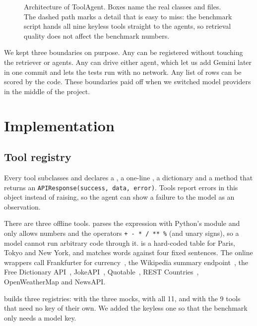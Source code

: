\documentclass[conference,a4paper]{IEEEtran}
\begin{document}
\begin{figure}[t]
  \centering
  
  \caption{Architecture of ToolAgent. Boxes name the real classes and
  files. The dashed path marks a detail that is easy to miss: the
  benchmark script hands all nine keyless tools straight to the agents,
  so retrieval quality does not affect the benchmark numbers.}
  \label{fig:arch}
\end{figure}

We kept three boundaries on purpose. Any  can be registered
without touching the retriever or agents. Any  can drive
either agent, which let us add Gemini later in one commit and lets the
tests run with no network. Any list of rows can be scored by the
 code. These boundaries paid off when we switched model
providers in the middle of the project.

\section{Implementation}

\subsection{Tool registry}
Every tool subclasses  and declares a , a one-line
, a  dictionary and a 
method that returns an \texttt{APIResponse(success, data, error)}. Tools
report errors in this object instead of raising, so the agent can show a
failure to the model as an observation.

There are three offline tools.  parses the expression
with Python's  module and only allows numbers and the operators
\texttt{+ - * / ** \%} (and unary signs), so a model cannot run arbitrary code through
it.  is a hard-coded table for Paris, Tokyo and New York, and
 matches words against four fixed sentences. The online
wrappers call Frankfurter for currency~\cite{frankfurter}, the Wikipedia
summary endpoint~\cite{wikipediarest}, the Free Dictionary
API~\cite{freedictionary}, JokeAPI~\cite{jokeapi}, Quotable~\cite{quotable},
REST Countries~\cite{restcountries}, OpenWeatherMap and NewsAPI.

 builds three registries: 
with the three mocks,  with all 11, and
 with the 9 tools that need no key of their own.
We added the keyless one so that the benchmark only needs a model key.
\end{document}
